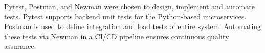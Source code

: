 \begin{justify}
Pytest, Postman, and Newman were chosen to design, implement and automate tests. Pytest supports backend unit tests for the Python-based microservices. Postman is used to define integration and load tests of entire system. Automating these tests via Newman in a CI/CD pipeline ensures continuous quality assurance.
\end{justify}

